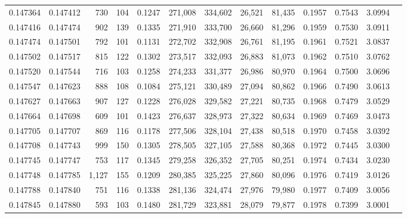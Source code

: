 \begin{tabular}{rrrrrrrrrrrrr}
0.147364 & 0.147412 &   730 & 104 &                                     0.1247 & 271,008 & 334,602 &  26,521 &  81,435 & 0.1957 & 0.7543 & 3.0994 \\
0.147416 & 0.147474 &   902 & 139 &                                     0.1335 & 271,910 & 333,700 &  26,660 &  81,296 & 0.1959 & 0.7530 & 3.0911 \\
0.147474 & 0.147501 &   792 & 101 &                                     0.1131 & 272,702 & 332,908 &  26,761 &  81,195 & 0.1961 & 0.7521 & 3.0837 \\
0.147502 & 0.147517 &   815 & 122 &                                     0.1302 & 273,517 & 332,093 &  26,883 &  81,073 & 0.1962 & 0.7510 & 3.0762 \\
0.147520 & 0.147544 &   716 & 103 &                                     0.1258 & 274,233 & 331,377 &  26,986 &  80,970 & 0.1964 & 0.7500 & 3.0696 \\
0.147547 & 0.147623 &   888 & 108 &                                     0.1084 & 275,121 & 330,489 &  27,094 &  80,862 & 0.1966 & 0.7490 & 3.0613 \\
0.147627 & 0.147663 &   907 & 127 &                                     0.1228 & 276,028 & 329,582 &  27,221 &  80,735 & 0.1968 & 0.7479 & 3.0529 \\
0.147664 & 0.147698 &   609 & 101 &                                     0.1423 & 276,637 & 328,973 &  27,322 &  80,634 & 0.1969 & 0.7469 & 3.0473 \\
0.147705 & 0.147707 &   869 & 116 &                                     0.1178 & 277,506 & 328,104 &  27,438 &  80,518 & 0.1970 & 0.7458 & 3.0392 \\
0.147708 & 0.147743 &   999 & 150 &                                     0.1305 & 278,505 & 327,105 &  27,588 &  80,368 & 0.1972 & 0.7445 & 3.0300 \\
0.147745 & 0.147747 &   753 & 117 &                                     0.1345 & 279,258 & 326,352 &  27,705 &  80,251 & 0.1974 & 0.7434 & 3.0230 \\
0.147748 & 0.147785 & 1,127 & 155 &                                     0.1209 & 280,385 & 325,225 &  27,860 &  80,096 & 0.1976 & 0.7419 & 3.0126 \\
0.147788 & 0.147840 &   751 & 116 &                                     0.1338 & 281,136 & 324,474 &  27,976 &  79,980 & 0.1977 & 0.7409 & 3.0056 \\
0.147845 & 0.147880 &   593 & 103 &                                     0.1480 & 281,729 & 323,881 &  28,079 &  79,877 & 0.1978 & 0.7399 & 3.0001 \\

\end{tabular}

